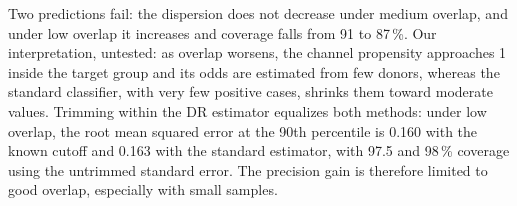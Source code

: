 Two predictions fail: the dispersion does not decrease under medium overlap, and under low overlap it increases and coverage falls from 91 to 87\,\%. Our interpretation, untested: as overlap worsens, the channel propensity approaches 1 inside the target group and its odds are estimated from few donors, whereas the standard classifier, with very few positive cases, shrinks them toward moderate values. Trimming within the DR estimator equalizes both methods: under low overlap, the root mean squared error at the 90th percentile is 0.160 with the known cutoff and 0.163 with the standard estimator, with 97.5 and 98\,\% coverage using the untrimmed standard error. The precision gain is therefore limited to good overlap, especially with small samples.
